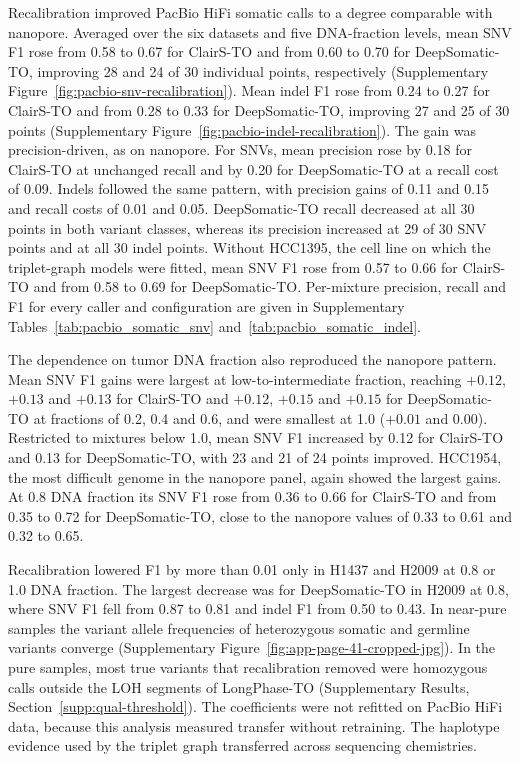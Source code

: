 \documentclass[pdflatex,sn-nature]{sn-jnl}
\begin{document}
Recalibration improved PacBio HiFi somatic calls to a degree comparable with nanopore. Averaged over the six datasets and five DNA-fraction levels, mean SNV F1 rose from 0.58 to 0.67 for ClairS-TO and from 0.60 to 0.70 for DeepSomatic-TO, improving 28 and 24 of 30 individual points, respectively (Supplementary Figure~\ref{fig:pacbio-snv-recalibration}). Mean indel F1 rose from 0.24 to 0.27 for ClairS-TO and from 0.28 to 0.33 for DeepSomatic-TO, improving 27 and 25 of 30 points (Supplementary Figure~\ref{fig:pacbio-indel-recalibration}). The gain was precision-driven, as on nanopore. For SNVs, mean precision rose by 0.18 for ClairS-TO at unchanged recall and by 0.20 for DeepSomatic-TO at a recall cost of 0.09. Indels followed the same pattern, with precision gains of 0.11 and 0.15 and recall costs of 0.01 and 0.05. DeepSomatic-TO recall decreased at all 30 points in both variant classes, whereas its precision increased at 29 of 30 SNV points and at all 30 indel points. Without HCC1395, the cell line on which the triplet-graph models were fitted, mean SNV F1 rose from 0.57 to 0.66 for ClairS-TO and from 0.58 to 0.69 for DeepSomatic-TO. Per-mixture precision, recall and F1 for every caller and configuration are given in Supplementary Tables~\ref{tab:pacbio_somatic_snv} and~\ref{tab:pacbio_somatic_indel}.

The dependence on tumor DNA fraction also reproduced the nanopore pattern. Mean SNV F1 gains were largest at low-to-intermediate fraction, reaching $+0.12$, $+0.13$ and $+0.13$ for ClairS-TO and $+0.12$, $+0.15$ and $+0.15$ for DeepSomatic-TO at fractions of 0.2, 0.4 and 0.6, and were smallest at 1.0 ($+0.01$ and 0.00). Restricted to mixtures below 1.0, mean SNV F1 increased by 0.12 for ClairS-TO and 0.13 for DeepSomatic-TO, with 23 and 21 of 24 points improved. HCC1954, the most difficult genome in the nanopore panel, again showed the largest gains. At 0.8 DNA fraction its SNV F1 rose from 0.36 to 0.66 for ClairS-TO and from 0.35 to 0.72 for DeepSomatic-TO, close to the nanopore values of 0.33 to 0.61 and 0.32 to 0.65.

Recalibration lowered F1 by more than 0.01 only in H1437 and H2009 at 0.8 or 1.0 DNA fraction. The largest decrease was for DeepSomatic-TO in H2009 at 0.8, where SNV F1 fell from 0.87 to 0.81 and indel F1 from 0.50 to 0.43. In near-pure samples the variant allele frequencies of heterozygous somatic and germline variants converge (Supplementary Figure~\ref{fig:app-page-41-cropped-jpg}). In the pure samples, most true variants that recalibration removed were homozygous calls outside the LOH segments of LongPhase-TO (Supplementary Results, Section~\ref{supp:qual-threshold}). The coefficients were not refitted on PacBio HiFi data, because this analysis measured transfer without retraining. The haplotype evidence used by the triplet graph transferred across sequencing chemistries.
\end{document}
